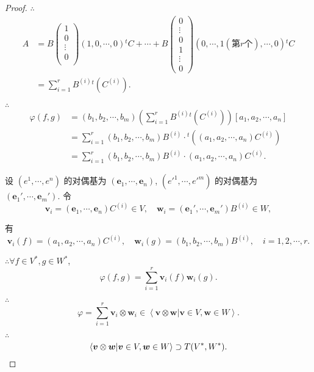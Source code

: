 \documentclass{ctexart}
\begin{document}
\begin{proof}
    $\therefore$
    \begin{align*}
        A & =B\begin{pmatrix}
            1 \\
            0 \\
            \vdots \\
            0 \\
        \end{pmatrix}(1,0,\cdots,0){}^tC+\cdots+B\begin{pmatrix}
            0 \\
            \vdots \\
            0 \\
            1 \\
            \vdots \\
            0
        \end{pmatrix}(0,\cdots,1(\text{第}r\text{个}),\cdots,0){}^tC \\
        & =\sum\limits_{i=1}^rB^{(i)}{}^t(C^{(i)}).
    \end{align*}

    $\therefore$
    \begin{align*}
        \varphi(f,g) & =(b_1,b_2,\cdots,b_m)\left(\sum\limits_{i=1}^rB^{(i)}{}^t(C^{(i)})\right)[a_1,a_2,\cdots,a_n] \\
        & =\sum\limits_{i=1}^r(b_1,b_2,\cdots,b_m)B^{(i)}\cdot{}^t((a_1,a_2,\cdots,a_n)C^{(i)}) \\
        & =\sum\limits_{i=1}^r(b_1,b_2,\cdots,b_m)B^{(i)}\cdot(a_1,a_2,\cdots,a_n)C^{(i)}.
    \end{align*}

    设 $(e^1,\cdots,e^n)$ 的对偶基为 $(\boldsymbol{e}_1,\cdots,\boldsymbol{e}_n)$, $(e'^1,\cdots,e'^m)$ 的对偶基为 $(\boldsymbol{e}_1',\cdots,\boldsymbol{e}_m')$. 令
    \[\boldsymbol{v}_i=(\boldsymbol{e}_1,\cdots,\boldsymbol{e}_n)C^{(i)}\in V,\quad\boldsymbol{w}_i=(\boldsymbol{e}_1',\cdots,\boldsymbol{e}_m')B^{(i)}\in W,\]
    
    有
    \[\boldsymbol{v}_i(f)=(a_1,a_2,\cdots,a_n)C^{(i)},\quad\boldsymbol{w}_i(g)=(b_1,b_2,\cdots,b_m)B^{(i)},\quad i=1,2,\cdots,r.\]

    $\therefore\forall f\in V^*,g\in W^*$,
    \[\varphi(f,g)=\sum\limits_{i=1}^r\boldsymbol{v}_i(f)\boldsymbol{w}_i(g).\]

    $\therefore$
    \[\varphi=\sum\limits_{i=1}^r\boldsymbol{v}_i\otimes\boldsymbol{w}_i\in\left<\boldsymbol{v}\otimes\boldsymbol{w}|\boldsymbol{v}\in V,\boldsymbol{w}\in W\right>.\]

    $\therefore$
    \[\left<\boldsymbol{v}\otimes\boldsymbol{w}|\boldsymbol{v}\in V,\boldsymbol{w}\in W\right>\supset T(V^*,W^*).\qedhere\]
\end{proof}
\end{document}
